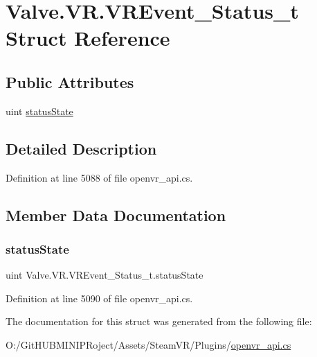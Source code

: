 \hypertarget{struct_valve_1_1_v_r_1_1_v_r_event___status__t}{}\section{Valve.\+V\+R.\+V\+R\+Event\+\_\+\+Status\+\_\+t Struct Reference}
\label{struct_valve_1_1_v_r_1_1_v_r_event___status__t}
\subsection*{Public Attributes}
\begin{DoxyCompactItemize}
\item 
uint \mbox{\hyperlink{struct_valve_1_1_v_r_1_1_v_r_event___status__t_a9dd37b4d00af3e009bf4e732bd62fc62}{status\+State}}
\end{DoxyCompactItemize}


\subsection{Detailed Description}


Definition at line 5088 of file openvr\+\_\+api.\+cs.



\subsection{Member Data Documentation}
\mbox{\label{struct_valve_1_1_v_r_1_1_v_r_event___status__t_a9dd37b4d00af3e009bf4e732bd62fc62}} 
\subsubsection{\texorpdfstring{statusState}{statusState}}
{\footnotesize\ttfamily uint Valve.\+V\+R.\+V\+R\+Event\+\_\+\+Status\+\_\+t.\+status\+State}



Definition at line 5090 of file openvr\+\_\+api.\+cs.



The documentation for this struct was generated from the following file\+:\begin{DoxyCompactItemize}
\item 
O\+:/\+Git\+H\+U\+B\+M\+I\+N\+I\+P\+Roject/\+Assets/\+Steam\+V\+R/\+Plugins/\mbox{\hyperlink{openvr__api_8cs}{openvr\+\_\+api.\+cs}}\end{DoxyCompactItemize}
